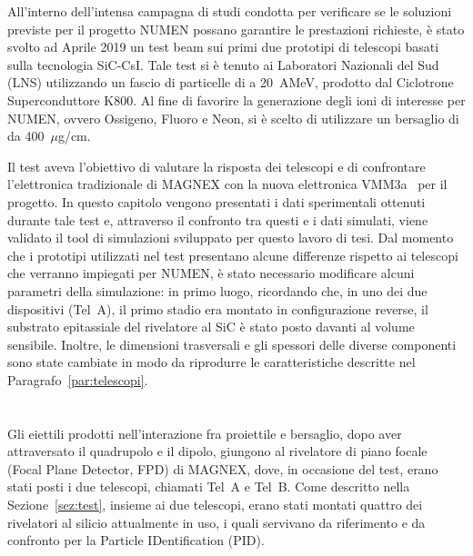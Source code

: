 
All'interno dell'intensa campagna di studi condotta per verificare se le soluzioni previste per il progetto NUMEN possano garantire le prestazioni richieste, è stato svolto ad Aprile 2019 un test beam sui primi due prototipi di telescopi basati sulla tecnologia SiC-CsI.
Tale test si è tenuto ai Laboratori Nazionali del Sud (LNS) utilizzando un fascio di particelle di  a 20~AMeV, prodotto dal Ciclotrone Superconduttore K800.
Al fine di favorire la generazione degli ioni di interesse per NUMEN, ovvero Ossigeno, Fluoro e Neon, si è scelto di utilizzare un bersaglio di  da 400~$\mu$g/cm.

Il test aveva l'obiettivo di valutare la risposta dei telescopi e di confrontare l'elettronica tradizionale di MAGNEX con la nuova elettronica VMM3a~\cite{degeronimo:ieee13} per il progetto.
In questo capitolo vengono presentati i dati sperimentali ottenuti durante tale test e, attraverso il confronto tra questi e i dati simulati, viene validato il tool di simulazioni sviluppato per questo lavoro di tesi.
Dal momento che i prototipi utilizzati nel test presentano alcune differenze rispetto ai telescopi che verranno impiegati per NUMEN, è stato necessario modificare alcuni parametri della simulazione: in primo luogo, ricordando che, in uno dei due dispositivi (Tel~A), il primo stadio era montato in configurazione reverse, il substrato epitassiale del rivelatore al SiC è stato posto davanti al volume sensibile.
Inoltre, le dimensioni trasversali e gli spessori delle diverse componenti sono state cambiate in modo da riprodurre le caratteristiche descritte nel Paragrafo~\ref{par:telescopi}.


\section{}


Gli eiettili prodotti nell'interazione fra proiettile e bersaglio, dopo aver attraversato il quadrupolo e il dipolo, giungono al rivelatore di piano focale (Focal Plane Detector, FPD) di MAGNEX, dove, in occasione del test, erano stati posti i due telescopi, chiamati Tel~A e Tel~B. 
Come descritto nella Sezione~\ref{sez:test}, insieme ai due telescopi, erano stati montati quattro dei rivelatori al silicio attualmente in uso, i quali servivano da riferimento e da confronto per la Particle IDentification (PID).

